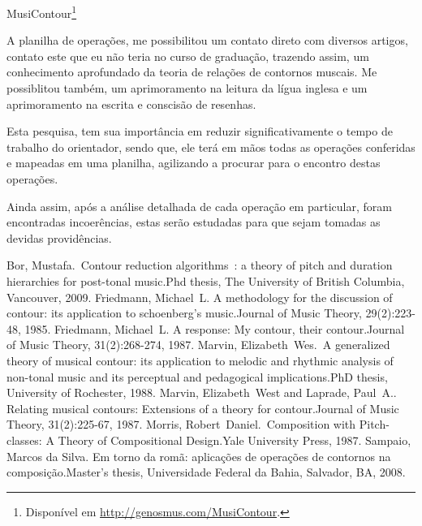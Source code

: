 \documentclass[11pt]{article}
\begin{document}
MusiContour\footnote{Disponível em \url{http://genosmus.com/MusiContour}.}

\label{sec:resultados}


A planilha de operações, me possibilitou um contato direto com
diversos artigos, contato este que eu não teria no curso de graduação,
trazendo assim, um conhecimento aprofundado da teoria de relações de
contornos muscais. Me possiblitou também, um aprimoramento na leitura
da lígua inglesa e um aprimoramento na escrita e conscisão de
resenhas.

\label{sec:discussao}

Esta pesquisa, tem sua importância em reduzir significativamente o
tempo de trabalho do orientador, sendo que, ele terá em mãos todas as
operações conferidas e mapeadas em uma planilha, agilizando a procurar
para o encontro destas operações.

Ainda assim, após a análise detalhada de cada operação em particular,
foram encontradas incoerências, estas serão estudadas para que sejam
tomadas as devidas providências.



Bor, Mustafa. Contour reduction algorithms : a theory of pitch and duration hierarchies for post-tonal music.Phd thesis, The University of British Columbia, Vancouver, 2009.
Friedmann, Michael L. A methodology for the discussion of contour: its application to schoenberg’s music.Journal of Music Theory, 29(2):223-48, 1985.
Friedmann, Michael L. A response: My contour, their contour.Journal of Music Theory, 31(2):268-274, 1987.
Marvin, Elizabeth Wes. A generalized theory of musical contour: its application to melodic and rhythmic analysis of non-tonal music and its perceptual and pedagogical implications.PhD thesis, University of Rochester, 1988.
Marvin, Elizabeth West and Laprade, Paul A.. Relating musical contours: Extensions of a theory for contour.Journal of Music Theory, 31(2):225-67, 1987.
Morris, Robert Daniel. Composition with Pitch-classes: A Theory of Compositional Design.Yale University Press, 1987.
Sampaio, Marcos da Silva. Em torno da romã: aplicações de operações de contornos na composição.Master’s thesis, Universidade Federal da Bahia, Salvador, BA, 2008.
\end{document}
